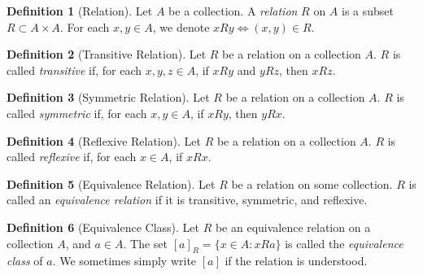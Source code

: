 \documentclass{article}
\theoremstyle{definition}
\newtheorem{definition}{Definition}[subsection]
\theoremstyle{theorem}
\begin{document}
\begin{definition}[Relation]
    Let $A$ be a collection. A \textit{relation} $R$ on $A$ is a subset $R\subset A\times A$. For each $x,y\in A$, we denote $xRy \iff (x,y)\in R$. 
\end{definition}
\begin{definition}[Transitive Relation]
    Let $R$ be a relation on a collection $A$. $R$ is called \textit{transitive} if, for each $x,y,z\in A$, if $xRy$ and $yRz$, then $xRz$.   
\end{definition}
\begin{definition}[Symmetric Relation]
    Let $R$ be a relation on a collection $A$. $R$ is called \textit{symmetric} if, for each $x,y\in A$, if $xRy$, then $yRx$.   
\end{definition}
\begin{definition}[Reflexive Relation]
    Let $R$ be a relation on a collection $A$. $R$ is called \textit{reflexive} if, for each $x\in A$, if $xRx$.   
\end{definition}
\begin{definition}[Equivalence Relation]
    Let $R$ be a relation on some collection. $R$ is called an \textit{equivalence relation} if it is transitive, symmetric, and reflexive.
\end{definition}
\begin{definition}[Equivalence Class]
    Let $R$ be an equivalence relation on a collection $A$, and $a\in A$. The set $[a]_R=\{x\in A:xRa\}$ is called the \textit{equivalence class} of $a$. We sometimes simply write $[a]$ if the relation is understood.
\end{definition}
\end{document}
